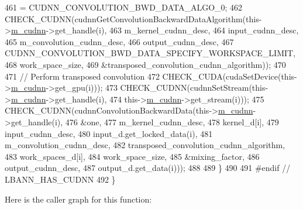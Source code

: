 \begin{DoxyCode}
461         = CUDNN\_CONVOLUTION\_BWD\_DATA\_ALGO\_0;
462       CHECK\_CUDNN(cudnnGetConvolutionBackwardDataAlgorithm(this->\hyperlink{classlbann_1_1Layer_a08dbb94239e3b8c96329786c57c72e21}{m\_cudnn}->get\_handle(i),
463                                                            m\_kernel\_cudnn\_desc,
464                                                            input\_cudnn\_desc,
465                                                            m\_convolution\_cudnn\_desc,
466                                                            output\_cudnn\_desc,
467                                                            
      CUDNN\_CONVOLUTION\_BWD\_DATA\_SPECIFY\_WORKSPACE\_LIMIT,
468                                                            work\_space\_size,
469                                                            &transposed\_convolution\_cudnn\_algorithm));
470 
471       \textcolor{comment}{// Perform transposed convolution}
472       CHECK\_CUDA(cudaSetDevice(this->\hyperlink{classlbann_1_1Layer_a08dbb94239e3b8c96329786c57c72e21}{m\_cudnn}->get\_gpu(i)));
473       CHECK\_CUDNN(cudnnSetStream(this->\hyperlink{classlbann_1_1Layer_a08dbb94239e3b8c96329786c57c72e21}{m\_cudnn}->get\_handle(i),
474                                  this->\hyperlink{classlbann_1_1Layer_a08dbb94239e3b8c96329786c57c72e21}{m\_cudnn}->get\_stream(i)));
475       CHECK\_CUDNN(cudnnConvolutionBackwardData(this->\hyperlink{classlbann_1_1Layer_a08dbb94239e3b8c96329786c57c72e21}{m\_cudnn}->get\_handle(i),
476                                                &one,
477                                                m\_kernel\_cudnn\_desc,
478                                                kernel\_d[i],
479                                                input\_cudnn\_desc,
480                                                input\_d.get\_locked\_data(i),
481                                                m\_convolution\_cudnn\_desc,
482                                                transposed\_convolution\_cudnn\_algorithm,
483                                                work\_spaces\_d[i],
484                                                work\_space\_size,
485                                                &mixing\_factor,
486                                                output\_cudnn\_desc,
487                                                output\_d.get\_data(i)));
488 
489     \}
490 
491 \textcolor{preprocessor}{  #endif // LBANN\_HAS\_CUDNN}
492   \}
\end{DoxyCode}
Here is the caller graph for this function\+:\nopagebreak
